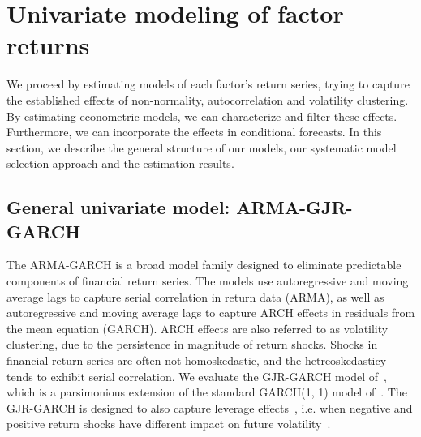 
\section{Univariate modeling of factor returns} %
\label{sec:univariate_modeling}

We proceed by estimating models of each factor's return series, trying to capture the established effects of non-normality, autocorrelation and volatility clustering. By estimating econometric models, we can characterize and filter these effects. Furthermore, we can incorporate the effects in conditional forecasts. In this section, we describe the general structure of our models, our systematic model selection approach and the estimation results.

\subsection{General univariate model: ARMA-GJR-GARCH} %
\label{sub:general_univariate_model_gjr_garch}

The ARMA-GARCH is a broad model family designed to eliminate predictable components of financial return series. The models use autoregressive and moving average lags to capture serial correlation in return data (ARMA), as well as autoregressive and moving average lags to capture ARCH effects in residuals from the mean equation (GARCH). ARCH effects are also referred to as volatility clustering, due to the persistence in magnitude of return shocks. Shocks in financial return series are often not homoskedastic, and the hetreoskedasticy tends to exhibit serial correlation. We evaluate the GJR-GARCH model of~\textcite{glosten1993relation}, which is a parsimonious extension of the standard GARCH(1, 1) model of~\autocite{Bollerslev1986}. The GJR-GARCH is designed to also capture leverage effects~\autocite{glosten1993relation}, i.e. when negative and positive return shocks have different impact on future volatility~\autocite{Black1976}.

